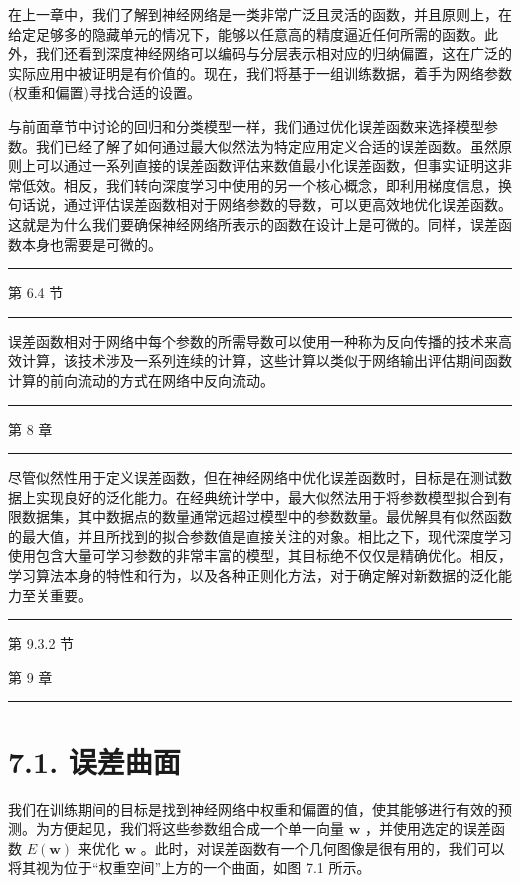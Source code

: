 \documentclass[10pt]{report}
\newcommand{\HRule}{\begin{center}\rule{0.9\linewidth}{0.2mm}\end{center}}
\begin{document}
在上一章中，我们了解到神经网络是一类非常广泛且灵活的函数，并且原则上，在给定足够多的隐藏单元的情况下，能够以任意高的精度逼近任何所需的函数。此外，我们还看到深度神经网络可以编码与分层表示相对应的归纳偏置，这在广泛的实际应用中被证明是有价值的。现在，我们将基于一组训练数据，着手为网络参数(权重和偏置)寻找合适的设置。

与前面章节中讨论的回归和分类模型一样，我们通过优化误差函数来选择模型参数。我们已经了解了如何通过最大似然法为特定应用定义合适的误差函数。虽然原则上可以通过一系列直接的误差函数评估来数值最小化误差函数，但事实证明这非常低效。相反，我们转向深度学习中使用的另一个核心概念，即利用梯度信息，换句话说，通过评估误差函数相对于网络参数的导数，可以更高效地优化误差函数。这就是为什么我们要确保神经网络所表示的函数在设计上是可微的。同样，误差函数本身也需要是可微的。

\HRule

第 6.4 节

\HRule

误差函数相对于网络中每个参数的所需导数可以使用一种称为反向传播的技术来高效计算，该技术涉及一系列连续的计算，这些计算以类似于网络输出评估期间函数计算的前向流动的方式在网络中反向流动。

\HRule

第 8 章

\HRule

尽管似然性用于定义误差函数，但在神经网络中优化误差函数时，目标是在测试数据上实现良好的泛化能力。在经典统计学中，最大似然法用于将参数模型拟合到有限数据集，其中数据点的数量通常远超过模型中的参数数量。最优解具有似然函数的最大值，并且所找到的拟合参数值是直接关注的对象。相比之下，现代深度学习使用包含大量可学习参数的非常丰富的模型，其目标绝不仅仅是精确优化。相反，学习算法本身的特性和行为，以及各种正则化方法，对于确定解对新数据的泛化能力至关重要。

\HRule

第 9.3.2 节

第 9 章

\HRule

\section*{7.1. 误差曲面}

我们在训练期间的目标是找到神经网络中权重和偏置的值，使其能够进行有效的预测。为方便起见，我们将这些参数组合成一个单一向量 \(\mathbf{w}\) ，并使用选定的误差函数 \(E\left( \mathbf{w}\right)\) 来优化 \(\mathbf{w}\) 。此时，对误差函数有一个几何图像是很有用的，我们可以将其视为位于“权重空间”上方的一个曲面，如图 7.1 所示。
\end{document}
